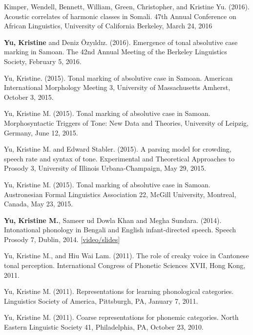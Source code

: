 \documentclass[10pt]{article}
\begin{document}
\begin{bibenum}
  \item Kimper, Wendell, Bennett, William, Green, Christopher, and Kristine Yu. (2016). Acoustic correlates of harmonic classes in
    Somali. 47th Annual Conference on African Linguistics, University
    of California Berkeley, March 24, 2016

  \item \textbf{Yu, Kristine} and Deniz \"{O}zy\i{}ld\i{}z. (2016). Emergence of tonal absolutive case
    marking in Samoan. The 42nd Annual Meeting of the Berkeley
    Linguistics Society, February 5, 2016.

  \item Yu, Kristine. (2015). Tonal marking of absolutive case in
    Samoan. American International Morphology Meeting 3, University of
    Massachusetts Amherst, October 3, 2015.

  \item Yu, Kristine M. (2015). Tonal marking of absolutive case in
    Samoan. Morphosyntactic Triggers of Tone:
New Data and Theories, University of Leipzig, Germany, June 12, 2015.  

  \item Yu, Kristine M. and Edward Stabler. (2015). A parsing model for crowding, speech rate and syntax of tone. Experimental and Theoretical Approaches to Prosody 3,
    University of Illinois Urbana-Champaign, May 29, 2015.

  \item Yu, Kristine M. (2015). Tonal marking of absolutive case in
    Samoan. Austronesian Formal Linguistics Association 22, McGill
    University, Montreal, Canada, May 23, 2015.  

\item \textbf{Yu, Kristine M.}, Sameer ud Dowla Khan and Megha
  Sundara. (2014). Intonational phonology in Bengali and English
  infant-directed speech. Speech Prosody 7, Dublin, 2014. [\href{https://www.superlectures.com/speechprosody2014/intonational-phonology-in-bengali-and-english-infant-directed-speech}{video/slides}]
  \item Yu, Kristine M., and Hiu Wai Lam. (2011). The role of creaky voice in Cantonese
    tonal perception. International Congress of Phonetic Sciences XVII, Hong Kong, 2011.

  \item Yu, Kristine M. (2011). Representations for learning
    phonological categories. Linguistics Society of America,
    Pittsburgh, PA, January 7, 2011.  

  \item Yu, Kristine M. (2011). Coarse representations for phonemic
    categories. North Eastern Linguistic Society 41, Philadelphia, PA,
    October 23, 2010. 


\end{bibenum}
\end{document}
